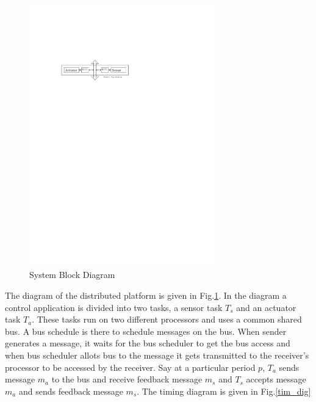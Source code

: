 
\begin{figure}
\begin{center}
\includegraphics[width = 80mm]{system_block_diagram.pdf}
\end{center}
\caption{System Block Diagram}
\label{block_dig}
\end{figure}

The diagram of the distributed platform is given in Fig.\ref{block_dig}.
In the diagram a control application is divided into two tasks, a sensor task $T_s$ and 
an actuator task $T_a$. These tasks run on two different processors and
uses a common shared bus. A bus schedule is there to schedule messages on the bus.
When sender generates a message, it waits for the bus scheduler to get the bus
access and when bus scheduler allots bus to the message it gets transmitted to
the receiver's processor to be accessed by the receiver. Say at a particular period  
$p$, $T_a$ sends message $m_a$ to the bus and receive feedback message $m_s$ and $T_s$
accepts message $m_a$ and sends feedback message $m_s$. The timing diagram is given in Fig.\ref{tim_dig}

